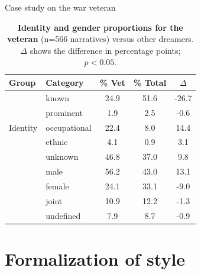 \documentclass[handout,10pt]{beamer}
\begin{document}
\begin{frame}{Case study on the war veteran}
  \begin{table}
    \centering
    \begin{tabular}{llccc}
\textbf{Group} & \textbf{Category} & \textbf{\% Vet} & \textbf{\% Total} & \textbf{$\Delta$} \\
\midrule
\multirow{5}{*}{Identity} & known & 24.9 & 51.6 & \textcolor{bluepanam}{-26.7} \\
& prominent & 1.9 & 2.5 & -0.6 \\
& occupational & 22.4 & 8.0 & \textcolor{bluepanam}{14.4} \\
& ethnic & 4.1 & 0.9 & \textcolor{bluepanam}{3.1} \\
& unknown & 46.8 & 37.0 & \textcolor{bluepanam}{9.8} \\
\addlinespace
\multirow{4}{*}{Gender} & male & 56.2 & 43.0 & \textcolor{bluepanam}{13.1} \\
& female & 24.1 & 33.1 & \textcolor{bluepanam}{-9.0} \\
& joint & 10.9 & 12.2 & -1.3 \\
& undefined & 7.9 & 8.7 & -0.9 \\
\end{tabular}
\caption{\textbf{Identity and gender proportions for the veteran} (n=566 narratives) versus other dreamers. \scriptsize{$\Delta$ shows the difference in percentage points; \textcolor{bluepanam}{$p<0.05$}.}}
\label{tab:case_study_war_veteran}
\end{table}

\vspace{-0.5cm}


\vspace{0.25cm}


\end{frame}

\section{Formalization of style}
\end{document}
